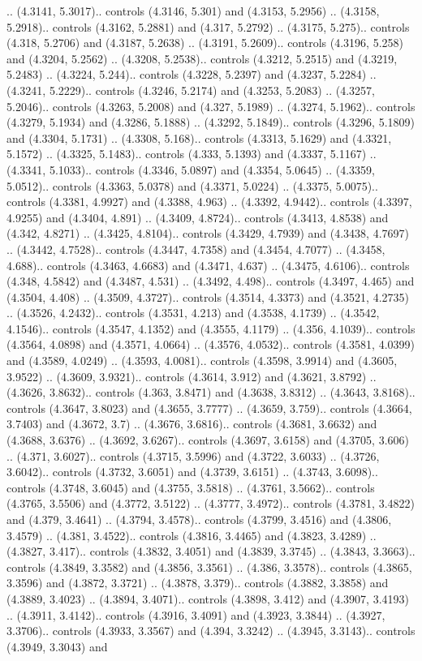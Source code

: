 .. (4.3141, 5.3017).. controls (4.3146, 5.301) and (4.3153, 5.2956) .. (4.3158, 5.2918).. controls (4.3162, 5.2881) and (4.317, 5.2792) .. (4.3175, 5.275).. controls (4.318, 5.2706) and (4.3187, 5.2638) .. (4.3191, 5.2609).. controls (4.3196, 5.258) and (4.3204, 5.2562) .. (4.3208, 5.2538).. controls (4.3212, 5.2515) and (4.3219, 5.2483) .. (4.3224, 5.244).. controls (4.3228, 5.2397) and (4.3237, 5.2284) .. (4.3241, 5.2229).. controls (4.3246, 5.2174) and (4.3253, 5.2083) .. (4.3257, 5.2046).. controls (4.3263, 5.2008) and (4.327, 5.1989) .. (4.3274, 5.1962).. controls (4.3279, 5.1934) and (4.3286, 5.1888) .. (4.3292, 5.1849).. controls (4.3296, 5.1809) and (4.3304, 5.1731) .. (4.3308, 5.168).. controls (4.3313, 5.1629) and (4.3321, 5.1572) .. (4.3325, 5.1483).. controls (4.333, 5.1393) and (4.3337, 5.1167) .. (4.3341, 5.1033).. controls (4.3346, 5.0897) and (4.3354, 5.0645) .. (4.3359, 5.0512).. controls (4.3363, 5.0378) and (4.3371, 5.0224) .. (4.3375, 5.0075).. controls (4.3381, 4.9927) and (4.3388, 4.963) .. (4.3392, 4.9442).. controls (4.3397, 4.9255) and (4.3404, 4.891) .. (4.3409, 4.8724).. controls (4.3413, 4.8538) and (4.342, 4.8271) .. (4.3425, 4.8104).. controls (4.3429, 4.7939) and (4.3438, 4.7697) .. (4.3442, 4.7528).. controls (4.3447, 4.7358) and (4.3454, 4.7077) .. (4.3458, 4.688).. controls (4.3463, 4.6683) and (4.3471, 4.637) .. (4.3475, 4.6106).. controls (4.348, 4.5842) and (4.3487, 4.531) .. (4.3492, 4.498).. controls (4.3497, 4.465) and (4.3504, 4.408) .. (4.3509, 4.3727).. controls (4.3514, 4.3373) and (4.3521, 4.2735) .. (4.3526, 4.2432).. controls (4.3531, 4.213) and (4.3538, 4.1739) .. (4.3542, 4.1546).. controls (4.3547, 4.1352) and (4.3555, 4.1179) .. (4.356, 4.1039).. controls (4.3564, 4.0898) and (4.3571, 4.0664) .. (4.3576, 4.0532).. controls (4.3581, 4.0399) and (4.3589, 4.0249) .. (4.3593, 4.0081).. controls (4.3598, 3.9914) and (4.3605, 3.9522) .. (4.3609, 3.9321).. controls (4.3614, 3.912) and (4.3621, 3.8792) .. (4.3626, 3.8632).. controls (4.363, 3.8471) and (4.3638, 3.8312) .. (4.3643, 3.8168).. controls (4.3647, 3.8023) and (4.3655, 3.7777) .. (4.3659, 3.759).. controls (4.3664, 3.7403) and (4.3672, 3.7) .. (4.3676, 3.6816).. controls (4.3681, 3.6632) and (4.3688, 3.6376) .. (4.3692, 3.6267).. controls (4.3697, 3.6158) and (4.3705, 3.606) .. (4.371, 3.6027).. controls (4.3715, 3.5996) and (4.3722, 3.6033) .. (4.3726, 3.6042).. controls (4.3732, 3.6051) and (4.3739, 3.6151) .. (4.3743, 3.6098).. controls (4.3748, 3.6045) and (4.3755, 3.5818) .. (4.3761, 3.5662).. controls (4.3765, 3.5506) and (4.3772, 3.5122) .. (4.3777, 3.4972).. controls (4.3781, 3.4822) and (4.379, 3.4641) .. (4.3794, 3.4578).. controls (4.3799, 3.4516) and (4.3806, 3.4579) .. (4.381, 3.4522).. controls (4.3816, 3.4465) and (4.3823, 3.4289) .. (4.3827, 3.417).. controls (4.3832, 3.4051) and (4.3839, 3.3745) .. (4.3843, 3.3663).. controls (4.3849, 3.3582) and (4.3856, 3.3561) .. (4.386, 3.3578).. controls (4.3865, 3.3596) and (4.3872, 3.3721) .. (4.3878, 3.379).. controls (4.3882, 3.3858) and (4.3889, 3.4023) .. (4.3894, 3.4071).. controls (4.3898, 3.412) and (4.3907, 3.4193) .. (4.3911, 3.4142).. controls (4.3916, 3.4091) and (4.3923, 3.3844) .. (4.3927, 3.3706).. controls (4.3933, 3.3567) and (4.394, 3.3242) .. (4.3945, 3.3143).. controls (4.3949, 3.3043) and 